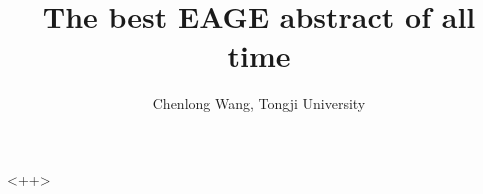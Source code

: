 \documentclass[11pt]{eageabs}
\begin{document}

\title{The best EAGE abstract of all time}
\author{Chenlong Wang, Tongji University} 

\maketitle

<++>
\end{document}
